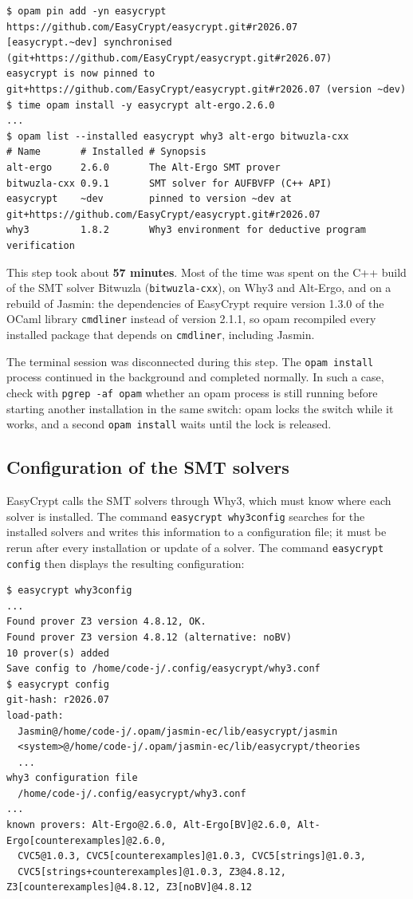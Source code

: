 \documentclass[11pt,a4paper]{article}
\newcommand{\cmd}[1]{\lstinline[style=shell,frame=none]{#1}}
\begin{document}
\begin{lstlisting}[style=shell]
$ opam pin add -yn easycrypt https://github.com/EasyCrypt/easycrypt.git#r2026.07
[easycrypt.~dev] synchronised (git+https://github.com/EasyCrypt/easycrypt.git#r2026.07)
easycrypt is now pinned to git+https://github.com/EasyCrypt/easycrypt.git#r2026.07 (version ~dev)
$ time opam install -y easycrypt alt-ergo.2.6.0
...
$ opam list --installed easycrypt why3 alt-ergo bitwuzla-cxx
# Name       # Installed # Synopsis
alt-ergo     2.6.0       The Alt-Ergo SMT prover
bitwuzla-cxx 0.9.1       SMT solver for AUFBVFP (C++ API)
easycrypt    ~dev        pinned to version ~dev at git+https://github.com/EasyCrypt/easycrypt.git#r2026.07
why3         1.8.2       Why3 environment for deductive program verification
\end{lstlisting}

This step took about \textbf{57 minutes}. Most of the time was spent on the
C++ build of the SMT solver Bitwuzla (\texttt{bitwuzla-cxx}), on Why3 and
Alt-Ergo, and on a rebuild of Jasmin: the dependencies of EasyCrypt require
version 1.3.0 of the OCaml library \texttt{cmdliner} instead of version
2.1.1, so opam recompiled every installed package that depends on
\texttt{cmdliner}, including Jasmin.

\begin{note}
The terminal session was disconnected during this step. The
\texttt{opam install} process continued in the background and completed
normally. In such a case, check with \cmd{pgrep -af opam} whether an opam
process is still running before starting another installation in the same
switch: opam locks the switch while it works, and a second
\texttt{opam install} waits until the lock is released.
\end{note}

\subsection{Configuration of the SMT solvers}
\label{sec:ec-config}

EasyCrypt calls the SMT solvers through Why3, which must know where each
solver is installed. The command \texttt{easycrypt why3config} searches for
the installed solvers and writes this information to a configuration file;
it must be rerun after every installation or update of a solver. The command
\texttt{easycrypt config} then displays the resulting configuration:

\begin{lstlisting}[style=shell]
$ easycrypt why3config
...
Found prover Z3 version 4.8.12, OK.
Found prover Z3 version 4.8.12 (alternative: noBV)
10 prover(s) added
Save config to /home/code-j/.config/easycrypt/why3.conf
$ easycrypt config
git-hash: r2026.07
load-path:
  Jasmin@/home/code-j/.opam/jasmin-ec/lib/easycrypt/jasmin
  <system>@/home/code-j/.opam/jasmin-ec/lib/easycrypt/theories
  ...
why3 configuration file
  /home/code-j/.config/easycrypt/why3.conf
...
known provers: Alt-Ergo@2.6.0, Alt-Ergo[BV]@2.6.0, Alt-Ergo[counterexamples]@2.6.0,
  CVC5@1.0.3, CVC5[counterexamples]@1.0.3, CVC5[strings]@1.0.3,
  CVC5[strings+counterexamples]@1.0.3, Z3@4.8.12, Z3[counterexamples]@4.8.12, Z3[noBV]@4.8.12
\end{lstlisting}
\end{document}
